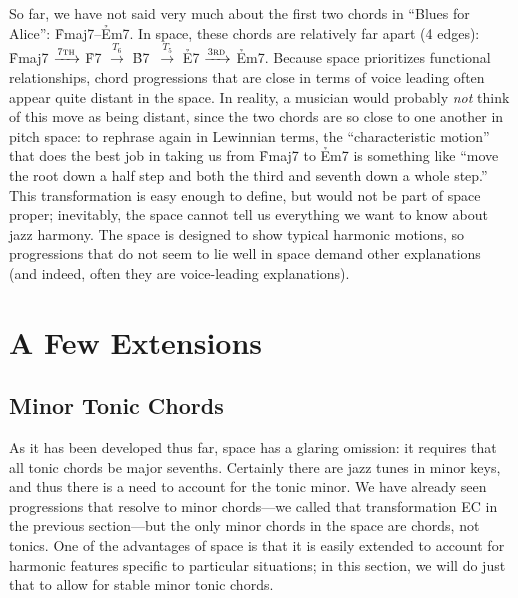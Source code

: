 So far, we have not said very much about the first two chords in ``Blues for
Alice'': \h{Fmaj7}--\h{Em7}. In \tf space, these chords are relatively far
apart (4 edges): \h{Fmaj7} $\xrightarrow{\text{\textsc{7th}}}$ \h{F7} $\xrightarrow{T_6}$
\mbox{\h{B7} $\xrightarrow{T_5}$} \h{E7} $\xrightarrow{\text{\textsc{3rd}}}$ \h{Em7}.
Because \tf space prioritizes functional relationships, chord progressions
that are close in terms of voice leading often appear quite distant in the
space. In reality, a musician would probably \emph{not} think of this move as
being distant, since the two chords are so close to one another
in pitch space: to rephrase again in Lewinnian terms, the ``characteristic
motion'' that does the best job in taking us from \h{Fmaj7} to \h{Em7} is
something like ``move the root down a half step and both the third and seventh
down a whole step.'' This transformation is easy enough to define, but would
not be part of \tf space proper; inevitably, the space cannot tell us
everything we want to know about jazz harmony. The space is designed to show
typical harmonic motions, so progressions that do not seem to lie well in \tf
space demand other explanations (and indeed, often they are voice-leading
explanations).





\section{A Few Extensions}
\label{sec:tf-extensions}

\subsection{Minor Tonic Chords}

As it has been developed thus far, \tf space has a glaring omission: it
requires that all tonic chords be major sevenths. Certainly there are jazz
tunes in minor keys, and thus there is a need to account for the tonic minor.
We have already seen \tf progressions that resolve to minor chords---we called
that transformation EC in the previous section---but the only minor chords in
the space are \ii chords, not tonics. One of the advantages of \tf space is
that it is easily extended to account for harmonic features specific to
particular situations; in this section, we will do just that to allow for
stable minor tonic chords.

